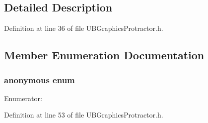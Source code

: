 \subsection{Detailed Description}


Definition at line 36 of file U\-B\-Graphics\-Protractor.\-h.



\subsection{Member Enumeration Documentation}
\hypertarget{class_u_b_graphics_protractor_a120aea43b8b800ccd9a5e9ac37337d27}{\subsubsection[{anonymous enum}]{\setlength{\rightskip}{0pt plus 5cm}anonymous enum}}\label{d5/d69/class_u_b_graphics_protractor_a120aea43b8b800ccd9a5e9ac37337d27}
\begin{Desc}
\item[Enumerator\-: ]\par
\begin{description}
\item[{\em 
\hypertarget{class_u_b_graphics_protractor_a120aea43b8b800ccd9a5e9ac37337d27a2a20daaf55182ebaa2c14a314859ee08}{Type}\label{d5/d69/class_u_b_graphics_protractor_a120aea43b8b800ccd9a5e9ac37337d27a2a20daaf55182ebaa2c14a314859ee08}
}]\end{description}
\end{Desc}



Definition at line 53 of file U\-B\-Graphics\-Protractor.\-h.


